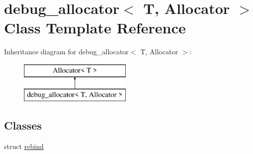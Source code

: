 \hypertarget{classdebug__allocator}{}\section{debug\+\_\+allocator$<$ T, Allocator $>$ Class Template Reference}
\label{classdebug__allocator}
Inheritance diagram for debug\+\_\+allocator$<$ T, Allocator $>$\+:\begin{figure}[H]
\begin{center}
\leavevmode
\includegraphics[height=2.000000cm]{classdebug__allocator}
\end{center}
\end{figure}
\subsection*{Classes}
\begin{DoxyCompactItemize}
\item 
struct \hyperlink{structdebug__allocator_1_1rebind}{rebind}
\end{DoxyCompactItemize}
